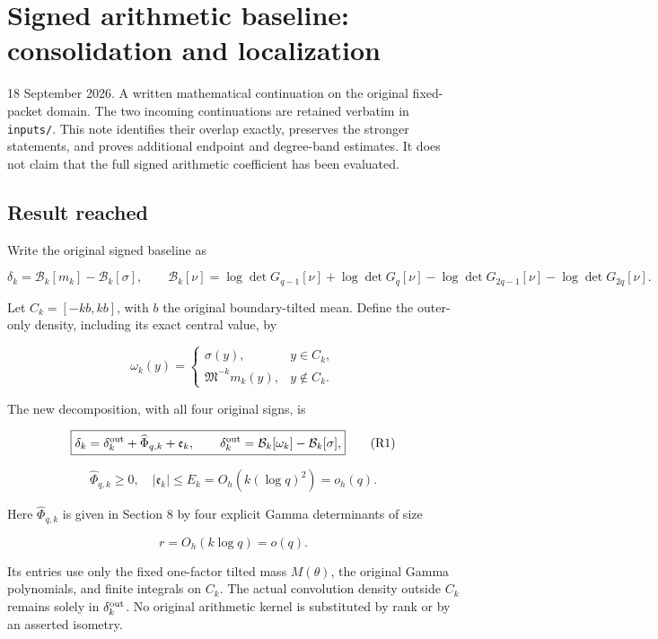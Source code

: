 \section{Signed arithmetic baseline: consolidation and localization}\label{signed-arithmetic-baseline-consolidation-and-localization}

18 September 2026. A written mathematical continuation on the original fixed-packet domain. The two incoming continuations are retained verbatim in \texttt{inputs/}. This note identifies their overlap exactly, preserves the stronger statements, and proves additional endpoint and degree-band estimates. It does not claim that the full signed arithmetic coefficient has been evaluated.

\subsection{Result reached}\label{result-reached}

Write the original signed baseline as

\[
\delta_k=\mathcal B_k[m_k]-\mathcal B_k[\sigma],\qquad
\mathcal B_k[\nu]=\log\det G_{q-1}[\nu]+\log\det G_q[\nu]
-\log\det G_{2q-1}[\nu]-\log\det G_{2q}[\nu].
\]

Let \(C_k=[-kb,kb]\), with \(b\) the original boundary-tilted mean. Define the outer-only density, including its exact central value, by

\[
\omega_k(y)=
\begin{cases}\sigma(y),&y\in C_k,\\
\mathfrak M^{-k}m_k(y),&y\notin C_k.
\end{cases}
\]

The new decomposition, with all four original signs, is

\[
\boxed{\delta_k=\delta_k^{\rm out}+\widehat\Phi_{q,k}+\mathfrak e_k,
\qquad \delta_k^{\rm out}=\mathcal B_k[\omega_k]-\mathcal B_k[\sigma],}
\tag{R1}
\]

\[
\boxed{\widehat\Phi_{q,k}\ge0,\quad
|\mathfrak e_k|\le E_k=O_h(k(\log q)^2)=o_h(q).}
\tag{R2}
\]

Here \(\widehat\Phi_{q,k}\) is given in Section 8 by four explicit Gamma determinants of size

\[
r=O_h(k\log q)=o(q).
\]

Its entries use only the fixed one-factor tilted mass \(M(\theta)\), the original Gamma polynomials, and finite integrals on \(C_k\). The actual convolution density outside \(C_k\) remains solely in \(\delta_k^{\rm out}\). No original arithmetic kernel is substituted by rank or by an asserted isometry.

